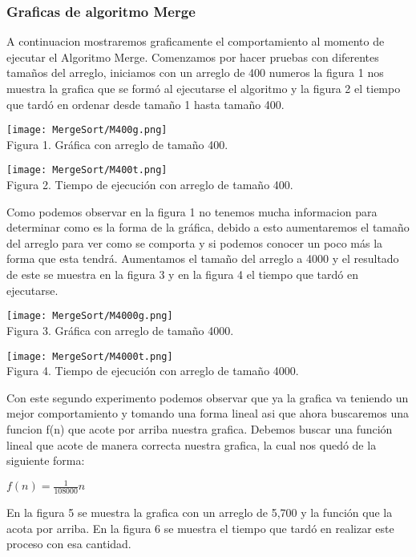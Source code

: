 \documentclass[12pt,twoside]{article}
\begin{document}
\subsubsection{Graficas de algoritmo Merge}
A continuacion mostraremos graficamente el comportamiento al momento de ejecutar el Algoritmo Merge.
Comenzamos por hacer pruebas con diferentes tamaños del arreglo, iniciamos con un arreglo de 400 numeros la figura 1 nos muestra la grafica que se form\'o al ejecutarse el algoritmo y la figura 2 el tiempo que tard\'o en ordenar desde tamaño 1 hasta tamaño 400.
\begin{center}
    \texttt{[image: MergeSort/M400g.png]}\\
    Figura 1. Gr\'afica con arreglo de tamaño 400.
\end{center}
\begin{center}
    \texttt{[image: MergeSort/M400t.png]}\\
    Figura 2. Tiempo de ejecuci\'on con arreglo de tamaño 400.
\end{center}
Como podemos observar en la figura 1 no tenemos mucha informacion para determinar como es la forma de la gr\'afica, debido a esto aumentaremos el tamaño del arreglo para ver como se comporta y si podemos conocer un poco m\'as la forma que esta tendr\'a.
Aumentamos el tamaño del arreglo a 4000 y el resultado de este se muestra en la figura 3 y en la figura 4 el tiempo que tard\'o en ejecutarse.
\begin{center}
    \texttt{[image: MergeSort/M4000g.png]}\\
    Figura 3. Gr\'afica con arreglo de tamaño 4000.
\end{center}
\begin{center}
    \texttt{[image: MergeSort/M4000t.png]}\\
    Figura 4. Tiempo de ejecuci\'on con arreglo de tamaño 4000.
\end{center}
Con este segundo experimento podemos observar que ya la grafica va teniendo un mejor comportamiento y tomando una forma lineal asi que ahora buscaremos una funcion f(n) que acote por arriba nuestra grafica.
Debemos buscar una funci\'on lineal que acote de manera correcta nuestra grafica, la cual nos qued\'o de la siguiente forma:
\begin{center}
    $f(n) = \frac{1}{108000}{n}$
\end{center}
En la figura 5 se muestra la grafica con un arreglo de 5,700 y la función que la acota por arriba. En la figura 6 se muestra el tiempo que tard\'o en realizar este proceso con esa cantidad.
\end{document}
